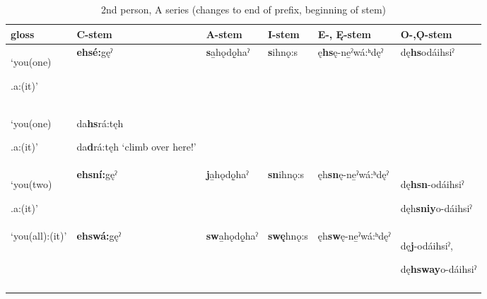 \begin{table}
\caption{2nd person, A series (changes to end of prefix, beginning of stem)}
\label{tab:1:2apron2}
\tiny{
\begin{tabularx}{\textwidth}{XXXXXX}
\lsptoprule
gloss & C-stem & A-stem & I-stem & E-, Ę{}-stem & O-,Ǫ{}-stem\\
\midrule
‘you(one)

.a:(it)’ & \textbf{ehsé:}gęˀ & \textbf{s}a̱hǫdǫ̱haˀ & \textbf{s}ihnǫ:s & ę\textbf{hs}ę-ne̱ˀwá:ʰdęˀ & dę\textbf{hs}odáihsiˀ\\
‘you(one)

.a:(it)’ & da\textbf{hs}rá:tęh

da\textbf{d}rá:tęh ‘climb over here!’ &  &  &  & \\
‘you(two)

.a:(it)’ & \textbf{ehsní:}gęˀ & \textbf{j}a̱hǫdǫ̱haˀ & \textbf{sn}ihnǫ:s & ęh\textbf{sn}ę-ne̱ˀwá:ʰdęˀ & dę\textbf{hsn}-odáihsiˀ

dęh\textbf{sniy}o-dáihsiˀ\\
‘you(all):(it)’ & \textbf{ehswá:}gęˀ & \textbf{sw}a̱hǫdǫ̱haˀ & \textbf{swę}hnǫ:s & ęh\textbf{sw}ę-ne̱ˀwá:ʰdęˀ & dę\textbf{j}-odáihsiˀ,

dę\textbf{hsway}o-dáihsiˀ \\
\lspbottomrule
\end{tabularx}}
\end{table}


